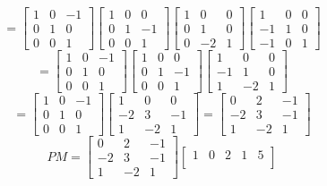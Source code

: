 \begin{description}
\begin{itemize}
$$= \begin{bmatrix}
1 & 0 & -1 \\
0 & 1 & 0 \\
0 & 0 & 1
\end{bmatrix}\begin{bmatrix}
1 & 0 & 0 \\
0 & 1 & -1 \\
0 & 0 & 1
\end{bmatrix}\begin{bmatrix}
1 & 0 & 0 \\
0 & 1 & 0 \\
0 & -2 & 1
\end{bmatrix}\begin{bmatrix}
1 & 0 & 0 \\
-1 & 1 & 0 \\
-1 & 0 & 1
\end{bmatrix}$$
$$= \begin{bmatrix}
1 & 0 & -1 \\
0 & 1 & 0 \\
0 & 0 & 1
\end{bmatrix}\begin{bmatrix}
1 & 0 & 0 \\
0 & 1 & -1 \\
0 & 0 & 1
\end{bmatrix}\begin{bmatrix}
1 & 0 & 0 \\
-1 & 1 & 0 \\
1 & -2 & 1
\end{bmatrix}$$
$$= \begin{bmatrix}
1 & 0 & -1 \\
0 & 1 & 0 \\
0 & 0 & 1
\end{bmatrix}\begin{bmatrix}
1 & 0 & 0 \\
-2 & 3 & -1 \\
1 & -2 & 1
\end{bmatrix} = \begin{bmatrix}
0 & 2 & -1 \\
-2 & 3 & -1 \\
1 & -2 & 1
\end{bmatrix}$$
$$PM = \begin{bmatrix}
0 & 2 & -1 \\
-2 & 3 & -1 \\
1 & -2 & 1
\end{bmatrix}\begin{bmatrix}
1 & 0 & 2 & 1 & 5 \\

\end{bmatrix}$$
\end{itemize}
\end{description}
